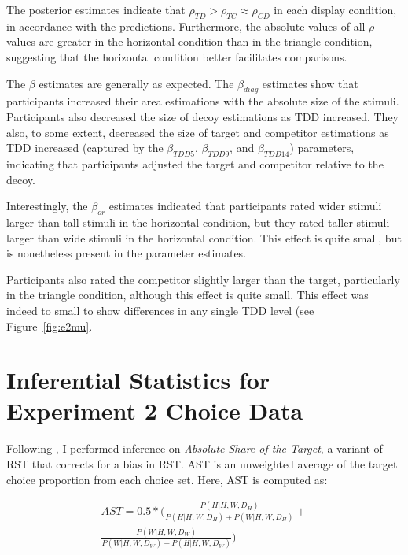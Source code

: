 The posterior estimates indicate that $\rho_{TD}>\rho_{TC}\approx\rho_{CD}$ in each display condition, in accordance with the predictions. Furthermore, the absolute values of all $\rho$ values are greater in the horizontal condition than in the triangle condition, suggesting that the horizontal condition better facilitates comparisons. 

The $\beta$ estimates are generally as expected. The $\beta_{diag}$ estimates show that participants increased their area estimations with the absolute size of the stimuli. Participants also decreased the size of decoy estimations as TDD increased. They also, to some extent, decreased the size of target and competitor estimations as TDD increased (captured by the $\beta_{TDD5}$, $\beta_{TDD9}$, and $\beta_{TDD14}$) parameters, indicating that participants adjusted the target and competitor relative to the decoy.

Interestingly, the $\beta_{or}$ estimates indicated that participants rated wider stimuli larger than tall stimuli in the horizontal condition, but they rated taller stimuli larger than wide stimuli in the horizontal condition. This effect is quite small, but is nonetheless present in the parameter estimates.

Participants also rated the competitor slightly larger than the target, particularly in the triangle condition, although this effect is quite small. This effect was indeed to small to show differences in any single TDD level (see Figure~\ref{fig:e2mu}. 

\chapter{Inferential Statistics for Experiment 2 Choice Data}

Following \textcite{katsimpokisRobustBayesianTest2022}, I performed inference on \textit{Absolute Share of the Target}, a variant of RST that corrects for a bias in RST. AST is an unweighted average of the target choice proportion from each choice set. Here, AST is computed as:

\begin{equation}
    \begin{aligned}
        AST=0.5*(\frac{P(H|{H,W,D_{H}})}{P(H|{H,W,D_{H}})+P(W|{H,W,D_{H}})}+ \\
        \frac{P(W|{H,W,D_{W}})}{P(W|{H,W,D_{W}})+P(H|{H,W,D_{W}})})
    \end{aligned}
\end{equation}

